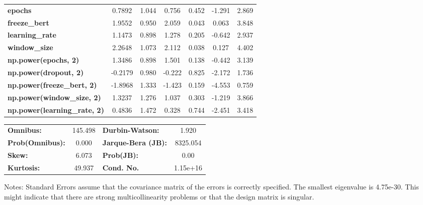 \begin{center}
\begin{tabular}{lcccccc}
\textbf{epochs}                            &       0.7892  &        1.044     &     0.756  &         0.452        &       -1.291    &        2.869     \\
\textbf{freeze\_bert}                      &       1.9552  &        0.950     &     2.059  &         0.043        &        0.063    &        3.848     \\
\textbf{learning\_rate}                    &       1.1473  &        0.898     &     1.278  &         0.205        &       -0.642    &        2.937     \\
\textbf{window\_size}                      &       2.2648  &        1.073     &     2.112  &         0.038        &        0.127    &        4.402     \\
\textbf{np.power(epochs, 2)}               &       1.3486  &        0.898     &     1.501  &         0.138        &       -0.442    &        3.139     \\
\textbf{np.power(dropout, 2)}              &      -0.2179  &        0.980     &    -0.222  &         0.825        &       -2.172    &        1.736     \\
\textbf{np.power(freeze\_bert, 2)}         &      -1.8968  &        1.333     &    -1.423  &         0.159        &       -4.553    &        0.759     \\
\textbf{np.power(window\_size, 2)}         &       1.3237  &        1.276     &     1.037  &         0.303        &       -1.219    &        3.866     \\
\textbf{np.power(learning\_rate, 2)}       &       0.4836  &        1.472     &     0.328  &         0.744        &       -2.451    &        3.418     \\
\bottomrule
\end{tabular}
\begin{tabular}{lclc}
\textbf{Omnibus:}       & 145.498 & \textbf{  Durbin-Watson:     } &    1.920  \\
\textbf{Prob(Omnibus):} &   0.000 & \textbf{  Jarque-Bera (JB):  } & 8325.054  \\
\textbf{Skew:}          &   6.073 & \textbf{  Prob(JB):          } &     0.00  \\
\textbf{Kurtosis:}      &  49.937 & \textbf{  Cond. No.          } & 1.15e+16  \\
\bottomrule
\end{tabular}
\end{center}

Notes: \newline
 [1] Standard Errors assume that the covariance matrix of the errors is correctly specified. \newline
 [2] The smallest eigenvalue is 4.75e-30. This might indicate that there are \newline
 strong multicollinearity problems or that the design matrix is singular.